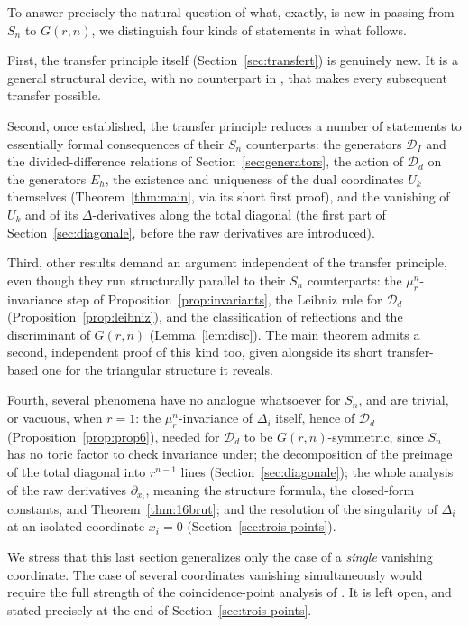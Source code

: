 \documentclass[10pt,a4paper]{amsart}
\begin{document}
To answer precisely the natural question of what, exactly, is new in passing from $S_n$ to $G(r,n)$, we distinguish four kinds of statements in what follows.

First, the transfer principle itself (Section~\ref{sec:transfert}) is genuinely new. It is a general structural device, with no counterpart in \cite{Ze}, that makes every subsequent transfer possible.

Second, once established, the transfer principle reduces a number of statements to essentially formal consequences of their $S_n$ counterparts: the generators $\mathcal D_I$ and the divided-difference relations of Section~\ref{sec:generators}, the action of $\mathcal D_d$ on the generators $E_h$, the existence and uniqueness of the dual coordinates $U_k$ themselves (Theorem~\ref{thm:main}, via its short first proof), and the vanishing of $U_k$ and of its $\Delta$-derivatives along the total diagonal (the first part of Section~\ref{sec:diagonale}, before the raw derivatives are introduced).

Third, other results demand an argument independent of the transfer principle, even though they run structurally parallel to their $S_n$ counterparts: the $\mu_r^n$-invariance step of Proposition~\ref{prop:invariants}, the Leibniz rule for $\mathcal D_d$ (Proposition~\ref{prop:leibniz}), and the classification of reflections and the discriminant of $G(r,n)$ (Lemma~\ref{lem:disc}). The main theorem admits a second, independent proof of this kind too, given alongside its short transfer-based one for the triangular structure it reveals.

Fourth, several phenomena have no analogue whatsoever for $S_n$, and are trivial, or vacuous, when $r=1$: the $\mu_r^n$-invariance of $\Delta_i$ itself, hence of $\mathcal D_d$ (Proposition~\ref{prop:prop6}), needed for $\mathcal D_d$ to be $G(r,n)$-symmetric, since $S_n$ has no toric factor to check invariance under; the decomposition of the preimage of the total diagonal into $r^{n-1}$ lines (Section~\ref{sec:diagonale}); the whole analysis of the raw derivatives $\partial_{x_i}$, meaning the structure formula, the closed-form constants, and Theorem~\ref{thm:16brut}; and the resolution of the singularity of $\Delta_i$ at an isolated coordinate $x_i=0$ (Section~\ref{sec:trois-points}).

We stress that this last section generalizes only the case of a \emph{single} vanishing coordinate. The case of several coordinates vanishing simultaneously would require the full strength of the coincidence-point analysis of \cite[\S3]{Ze}. It is left open, and stated precisely at the end of Section~\ref{sec:trois-points}.
\end{document}
